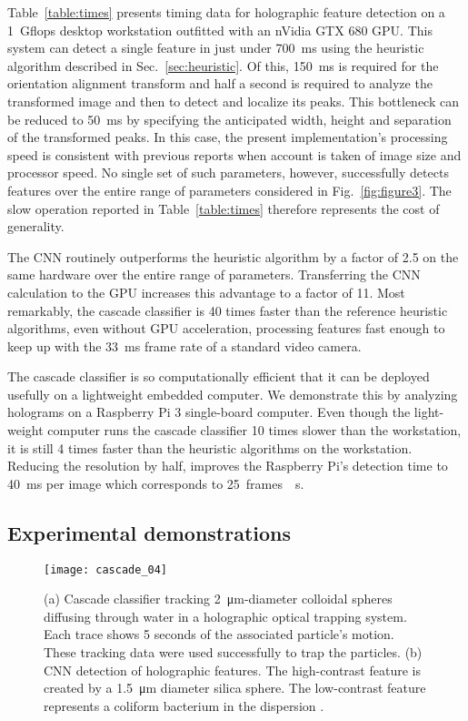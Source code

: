 Table~\ref{table:times} presents timing data for holographic
feature detection on a \SI{1}{Gflops} desktop workstation
outfitted with an
nVidia GTX 680 GPU.
This system can detect a single feature in just under
\SI{700}{\ms} using the heuristic
algorithm described in Sec.~\ref{sec:heuristic}.
Of this, \SI{150}{\ms} is required for the orientation alignment
transform and half a second is required to analyze the
transformed image and then to detect and localize
its peaks.
This bottleneck can be reduced to \SI{50}{\ms} by specifying
the anticipated width, height and separation of the
transformed peaks.
In this case, the present implementation's processing speed
is consistent with previous reports \cite{lee07a,cheong09,allan16trackpy}
when account is taken of image size and processor speed.
No single set of such parameters, however, successfully detects
features over the entire range of parameters considered in
Fig.~\ref{fig:figure3}.
The slow operation reported in Table~\ref{table:times}
therefore represents the cost of generality.

The CNN routinely
outperforms the heuristic algorithm by
a factor of \num{2.5} on the same hardware over the entire
range of parameters.
Transferring the CNN calculation to the GPU
increases this advantage to a factor of \num{11}.
Most remarkably, the cascade classifier is \num{40} times
faster than the reference heuristic algorithms,
even without GPU acceleration, processing features
fast enough to keep up with the \SI{33}{\ms} frame
rate of a standard video camera.

The cascade classifier is so computationally efficient
that it can be deployed usefully on a lightweight
embedded computer. 
We demonstrate this by analyzing holograms on
a Raspberry Pi 3 single-board computer.
Even though the light-weight computer runs the
cascade classifier \num{10} times slower than the
workstation,  it is still \num{4} times faster than the heuristic 
algorithms on the workstation.
Reducing the resolution by half, improves the 
Raspberry Pi's detection time to \SI{40}{\ms} per image 
which corresponds to \SI{25}{frames \per \second}.

\subsection{Experimental demonstrations}
\label{sec:experiment}

\begin{figure}[!b]
  \centering
  \texttt{[image: cascade\_04]}
  \caption{(a) Cascade classifier tracking \SI{2}{\um}-diameter
    colloidal spheres diffusing through water in a
    holographic optical trapping system.
    Each trace shows 5 seconds of the associated particle's motion.
    These tracking data were used successfully to trap
    the particles.
    (b) CNN detection of holographic features.
    The high-contrast feature is created by a \SI{1.5}{\um}
    diameter silica sphere.  The low-contrast feature
    represents a coliform bacterium in the dispersion \cite{hannel18}.}
  \label{fig:autotrap}
\end{figure}

